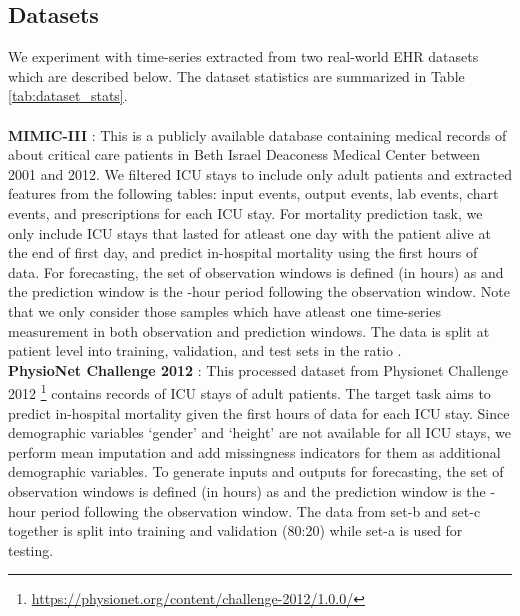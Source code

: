 \subsection{Datasets}
We experiment with time-series extracted from two real-world EHR datasets which are described below. 
The dataset statistics are summarized in Table \ref{tab:dataset_stats}.  \\ \\
\noindent
\textbf{MIMIC-III} \citep{mimiciii}: This is a publicly available database containing medical records of about  critical care patients in Beth Israel Deaconess Medical Center between 2001 and 2012. We filtered ICU stays to include only adult patients and extracted   features from the following tables: input events, output events, lab events, chart events, and prescriptions for each ICU stay. For mortality prediction task, we only include ICU stays that lasted for atleast one day with the patient alive at the end of first day, and predict in-hospital mortality using the first  hours of data. For forecasting, the set of observation windows is defined (in hours) as  and the prediction window is the -hour period following the observation window. Note that we only consider those samples which have atleast one time-series measurement in both observation and prediction windows. The data is split at patient level into training, validation, and test sets in the ratio .
\\ 


\noindent
\textbf{PhysioNet Challenge 2012} \citep{goldberger2000physiobank}: This processed dataset from Physionet Challenge 2012 \footnote{\url{https://physionet.org/content/challenge-2012/1.0.0/}} contains records of   ICU stays of adult patients. 
The target task aims to predict in-hospital mortality given the first  hours of data for each ICU stay. Since demographic variables `gender' and `height' are not available for all ICU stays, we perform mean imputation and add missingness indicators for them as additional demographic variables.
To generate inputs and outputs for forecasting, the set of observation windows is defined (in hours) as  and the prediction window is the -hour period following the observation window. The data from set-b and set-c together is split into training and validation (80:20) while set-a is used for testing.






